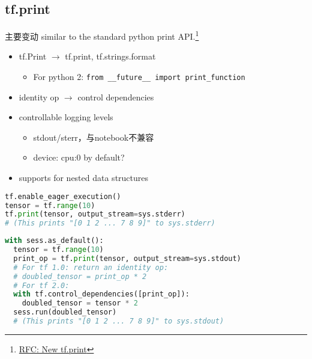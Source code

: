 
\subsection{tf.print}
\begin{frame}{主要变动}
    similar to the standard python print API.\footnote{\href{https://github.com/tensorflow/community/pull/14}{RFC: New tf.print}}


    \begin{itemize}
        \item tf.Print $\to$ tf.print, tf.strings.format
            \begin{itemize}
                \item For python 2: \lstinline{from __future__ import print_function}
            \end{itemize}
        \item identity op $\to$ control dependencies
        \item controllable logging levels
            \begin{itemize}
                \item stdout/sterr，与notebook不兼容
                \item device: cpu:0 by default?
            \end{itemize}
        \item supports for nested data structures
    \end{itemize}
\end{frame}

\begin{frame}[fragile]
\begin{lstlisting}[language=Python,style=myScalastyle, caption=eager mode]
tf.enable_eager_execution()
tensor = tf.range(10)
tf.print(tensor, output_stream=sys.stderr)
# (This prints "[0 1 2 ... 7 8 9]" to sys.stderr)
\end{lstlisting}

\begin{lstlisting}[language=Python,style=myScalastyle, caption=graph mode]
with sess.as_default():
  tensor = tf.range(10)
  print_op = tf.print(tensor, output_stream=sys.stdout)
  # For tf 1.0: return an identity op:
  # doubled_tensor = print_op * 2
  # For tf 2.0:
  with tf.control_dependencies([print_op]):
    doubled_tensor = tensor * 2
  sess.run(doubled_tensor)
  # (This prints "[0 1 2 ... 7 8 9]" to sys.stdout)
\end{lstlisting}
\end{frame}
